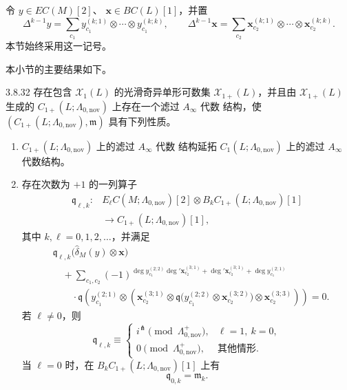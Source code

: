 令
$y\in EC(M)[2]$、
$\mathbf x\in BC(L)[1]$，并置
\[
 \Delta^{k-1}y
 =
 \sum_{c_1}
 y_{c_1}^{(k;1)}\otimes\cdots\otimes y_{c_1}^{(k;k)},
 \qquad
 \Delta^{k-1}\mathbf x
 =
 \sum_{c_2}
 \mathbf x_{c_2}^{(k;1)}\otimes\cdots
 \otimes\mathbf x_{c_2}^{(k;k)}.
\]
本节始终采用这一记号。

本小节的主要结果如下。

\begin{theorem}{3.8.32}\label{thm:3-8-32}
存在包含 $\mathcal X_1(L)$ 的光滑奇异单形可数集
$\mathcal X_{1+}(L)$，并且由 $\mathcal X_{1+}(L)$ 生成的
$C_{1+}(L;\Lambda_{0,\mathrm{nov}})$ 上存在一个滤过 $A_\infty$ 代数
结构，使
$(C_{1+}(L;\Lambda_{0,\mathrm{nov}}),\mathfrak m)$ 具有下列性质。

\begin{enumerate}[label=\textup{(\arabic*)},leftmargin=2.8em]
  \item $C_{1+}(L;\Lambda_{0,\mathrm{nov}})$ 上的滤过 $A_\infty$ 代数
  结构延拓
  $C_1(L;\Lambda_{0,\mathrm{nov}})$ 上的滤过 $A_\infty$ 代数结构。

  \item 存在次数为 $+1$ 的一列算子
  \[
  \begin{aligned}
   \mathfrak q_{\ell,k}\colon{}&
   E_\ell C(M;\Lambda_{0,\mathrm{nov}})[2]
   \otimes
   B_kC_{1+}(L;\Lambda_{0,\mathrm{nov}})[1]\\
   &\longrightarrow C_{1+}(L;\Lambda_{0,\mathrm{nov}})[1],
  \end{aligned}
  \]
  其中 $k,\ell=0,1,2,\ldots$，并满足
  \begin{equation}
  \begin{aligned}
   &\mathfrak q_{\ell,k}
   \bigl(\widehat\delta_M(y)\otimes\mathbf x\bigr)\\
   &\quad+
   \sum_{c_1,c_2}
   (-1)^{
    \deg y_{c_1}^{(2;2)}
      \deg'\mathbf x_{c_2}^{(3;1)}
    +\deg'\mathbf x_{c_2}^{(3;1)}
    +\deg y_{c_1}^{(2;1)}}\\
   &\qquad\cdot
   \mathfrak q\left(
    y_{c_1}^{(2;1)}
    \otimes
    \left(
     \mathbf x_{c_2}^{(3;1)}
     \otimes
     \mathfrak q\bigl(
      y_{c_1}^{(2;2)}
      \otimes\mathbf x_{c_2}^{(3;2)}
     \bigr)
     \otimes\mathbf x_{c_2}^{(3;3)}
    \right)
   \right)=0.
  \end{aligned}
  \tag{3.8.33}\label{eq:3-8-33}
  \end{equation}
  若 $\ell\ne0$，则
  \begin{equation}
   \mathfrak q_{\ell,k}
   \equiv
   \begin{cases}
    i^\pitchfork\pmod{\Lambda^+_{0,\mathrm{nov}}},
      &\ell=1,\ k=0,\\
    0\pmod{\Lambda^+_{0,\mathrm{nov}}},
      &\text{其他情形}.
   \end{cases}
  \tag{3.8.34.1}\label{eq:3-8-34-1}
  \end{equation}
  当 $\ell=0$ 时，在
  $B_kC_{1+}(L;\Lambda_{0,\mathrm{nov}})[1]$ 上有
  \begin{equation}
   \mathfrak q_{0,k}=\mathfrak m_k.
  \tag{3.8.34.2}\label{eq:3-8-34-2}
  \end{equation}


\end{enumerate}
\end{theorem}
